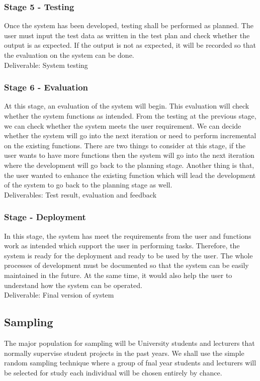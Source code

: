 \documentclass{article}
\begin{document}
\subsubsection{Stage 5 - Testing}
\par Once the system has been developed, testing shall be performed as planned. The user
must input the test data as written in the test plan and check whether the output is as expected. If
the output is not as expected, it will be recorded so that the evaluation on the system can be done.\\
Deliverable: System testing
\subsubsection{Stage 6 - Evaluation}
\par At this stage, an evaluation of the system will begin. This evaluation will check whether
the system functions as intended. From the testing at the previous stage, we can check whether
the system meets the user requirement. We can decide whether the system will go into the next
iteration or need to perform incremental on the existing functions. There are two things to
consider at this stage, if the user wants to have more functions then the system will go into the
next iteration where the development will go back to the planning stage. Another thing is that,
the user wanted to enhance the existing function which will lead the development of the system
to go back to the planning stage as well.\\
Deliverables: Test result, evaluation and feedback
\subsubsection{Stage - Deployment}
\par In this stage, the system has meet the requirements from the user and functions work as
intended which support the user in performing tasks. Therefore, the system is ready for the deployment and ready to be used by the user. The whole processes of development must be documented so that the system can be easily maintained in the future. At the same time, it would also help the user to understand how the system can be operated.\\
Deliverable: Final version of system
\subsection{Sampling}
\par The major population for sampling will be University students and lecturers
that normally supervise student projects in the past years. We shall use the
simple random sampling technique where a group of fnal year students and
lecturers will be selected for study each individual will be chosen entirely by
chance.
\end{document}
